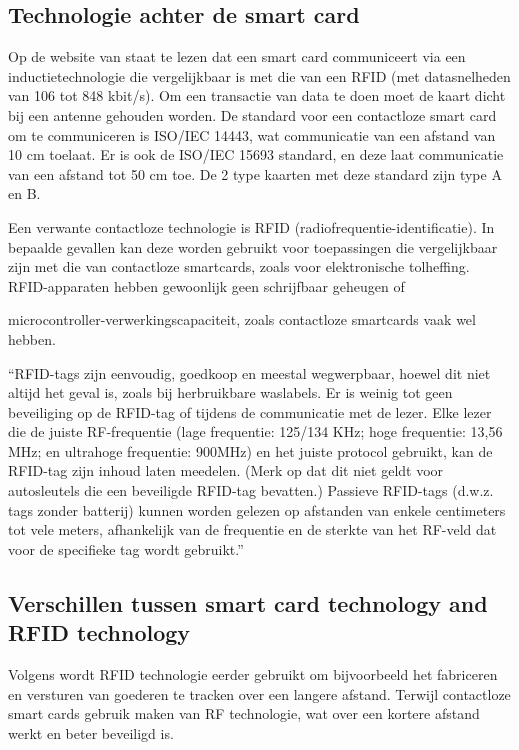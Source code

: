 \subsection{Technologie achter de smart card}
Op de website van \textcite{STASmartCard} staat te lezen dat een smart card communiceert via een inductietechnologie die vergelijkbaar is met die van een RFID (met datasnelheden van 106 tot 848 kbit/s). Om een transactie van data te doen moet de kaart dicht bij een antenne gehouden worden. De standard voor een contactloze smart card om te communiceren is ISO/IEC 14443, wat communicatie van een afstand van 10 cm toelaat. Er is ook de ISO/IEC 15693 standard, en deze laat communicatie van een afstand tot 50 cm toe. De 2 type kaarten met deze standard zijn type A en B. 

Een verwante contactloze technologie is RFID (radiofrequentie-identificatie). In bepaalde gevallen kan deze worden gebruikt voor toepassingen die vergelijkbaar zijn met die van contactloze smartcards, zoals voor elektronische tolheffing. RFID-apparaten hebben gewoonlijk geen schrijfbaar geheugen of 

microcontroller-verwerkingscapaciteit, zoals contactloze smartcards vaak wel hebben.

``RFID-tags zijn eenvoudig, goedkoop en meestal wegwerpbaar, hoewel dit niet altijd het geval is, zoals bij herbruikbare waslabels. Er is weinig tot geen beveiliging op de RFID-tag of tijdens de communicatie met de lezer. Elke lezer die de juiste RF-frequentie (lage frequentie: 125/134 KHz; hoge frequentie: 13,56 MHz; en ultrahoge frequentie: 900MHz) en het juiste protocol gebruikt, kan de RFID-tag zijn inhoud laten meedelen. (Merk op dat dit niet geldt voor autosleutels die een beveiligde RFID-tag bevatten.) Passieve RFID-tags (d.w.z. tags zonder batterij) kunnen worden gelezen op afstanden van enkele centimeters tot vele meters, afhankelijk van de frequentie en de sterkte van het RF-veld dat voor de specifieke tag wordt gebruikt.''\autocite{STASmartCard}

\subsection{Verschillen tussen smart card technology and RFID technology}
Volgens \textcite{STASmartCard} wordt RFID technologie eerder gebruikt om bijvoorbeeld het fabriceren en versturen van goederen te tracken over een langere afstand. Terwijl contactloze smart cards gebruik maken van RF technologie, wat over een kortere afstand werkt en beter beveiligd is.

